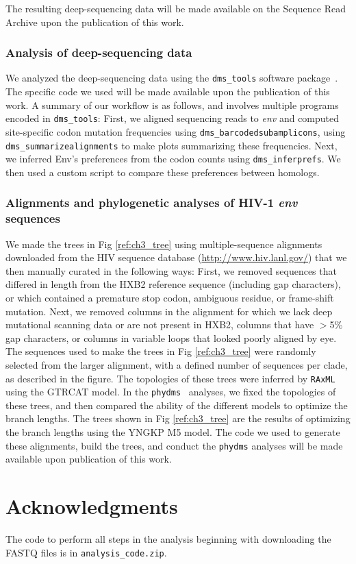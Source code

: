 \documentclass[9pt,lineno]{elife}
\begin{document}
The resulting deep-sequencing data will be made available on the Sequence Read Archive upon the publication of this work.

\subsubsection*{Analysis of deep-sequencing data}

We analyzed the deep-sequencing data using the \texttt{dms\_tools} software package~\cite{bloom2015software}.
The specific code we used will be made available upon the publication of this work.
A summary of our workflow is as follows, and involves multiple programs encoded in \texttt{dms\_tools}:
First, we aligned sequencing reads to \textit{env} and computed site-specific codon mutation frequencies using \texttt{dms\_barcodedsubamplicons}, using \texttt{dms\_summarizealignments} to make plots summarizing these frequencies.
Next, we inferred Env's preferences from the codon counts using \texttt{dms\_inferprefs}.
We then used a custom script to compare these preferences between homologs.

\subsubsection*{Alignments and phylogenetic analyses of HIV-1 {\it env} sequences}
We made the trees in Fig \ref{ref:ch3_tree} using multiple-sequence alignments downloaded from the HIV sequence database (\url{http://www.hiv.lanl.gov/}) that we then manually curated in the following ways:
First, we removed sequences that differed in length from the HXB2 reference sequence (including gap characters), or which contained a premature stop codon, ambiguous residue, or frame-shift mutation.
Next, we removed columns in the alignment for which we lack deep mutational scanning data or are not present in HXB2, columns that have $>$5\% gap characters, or columns in variable loops that looked poorly aligned by eye.
The sequences used to make the trees in Fig \ref{ref:ch3_tree} were randomly selected from the larger alignment, with a defined number of sequences per clade, as described in the figure.
The topologies of these trees were inferred by \texttt{RAxML} using the GTRCAT model.
In the \texttt{phydms}~\cite{hilton2017phydms} analyses, we fixed the topologies of these trees, and then compared the ability of the different models to optimize the branch lengths.
The trees shown in Fig \ref{ref:ch3_tree} are the results of optimizing the branch lengths using the YNGKP M5 model.
The code we used to generate these alignments, build the trees, and conduct the \texttt{phydms} analyses will be made available upon publication of this work.

\section{Acknowledgments}



\begin{suppfile}
\caption{
\label{suppfile:code}
The code to perform all steps in the analysis beginning with downloading the FASTQ files is in \texttt{analysis\_code.zip}.}
\end{suppfile}
\end{document}

